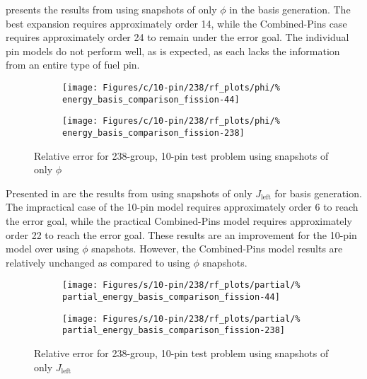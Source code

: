  presents the results from using 
snapshots of only $\phi$ in the basis generation.  The best expansion 
requires approximately order 14, while the Combined-Pins case requires 
approximately order 24 to remain under the error goal.  The individual pin 
models do not perform well, as is expected, as each lacks the information from 
an 
entire type of fuel pin.

\begin{figure*}[tb]
    \centering
    \begin{subfigure}{0.5\textwidth}
        \centering
        \texttt{[image: Figures/c/10-pin/238/rf\_plots/phi/\%
            energy\_basis\_comparison\_fission-44]}
    \end{subfigure}%
    \begin{subfigure}{0.5\textwidth}
        \centering
        \texttt{[image: Figures/c/10-pin/238/rf\_plots/phi/\%
            energy\_basis\_comparison\_fission-238]}
    \end{subfigure}
    \caption{Relative error for 238-group, 10-pin test problem using snapshots 
    of only $\phi$}
    \label{fig:10-pin-238phi}
\end{figure*}

Presented in  are the results from using 
snapshots of only $J_{\text{left}}$ for basis generation. The 
impractical case of the 10-pin model requires approximately order 6 to reach 
the error goal, while the practical Combined-Pins model requires approximately 
order 22 to reach the error goal.  These results are an improvement for the 
10-pin model over using $\phi$ snapshots. However, the Combined-Pins model 
results are relatively unchanged as compared to using $\phi$ snapshots.

\begin{figure*}[tb]
    \centering
    \begin{subfigure}{0.5\textwidth}
        \centering
        \texttt{[image: Figures/s/10-pin/238/rf\_plots/partial/\%
            partial\_energy\_basis\_comparison\_fission-44]}
    \end{subfigure}%
    \begin{subfigure}{0.5\textwidth}
        \centering
        \texttt{[image: Figures/s/10-pin/238/rf\_plots/partial/\%
            partial\_energy\_basis\_comparison\_fission-238]}
    \end{subfigure}
    \caption{Relative error for 238-group, 10-pin test problem using snapshots 
        of only $J_{\text{left}}$}
    \label{fig:10-pin-238partial}
\end{figure*}

